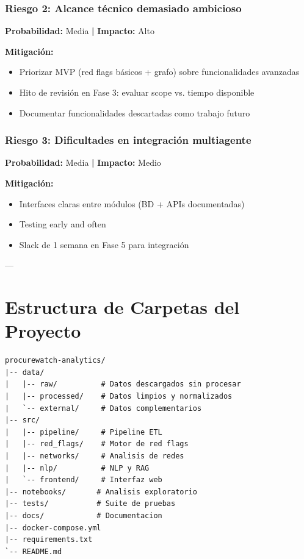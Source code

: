 \documentclass[11pt,a4paper,spanish]{book}
\numberwithin{equation}{chapter}
\numberwithin{figure}{chapter}
\begin{document}
\subsection{Riesgo 2: Alcance técnico demasiado ambicioso}

\textbf{Probabilidad:} Media \textbf{|} \textbf{Impacto:} Alto

\textbf{Mitigación:}
\begin{itemize}
\item Priorizar MVP (red flags básicos + grafo) sobre funcionalidades avanzadas
\item Hito de revisión en Fase 3: evaluar scope vs. tiempo disponible
\item Documentar funcionalidades descartadas como trabajo futuro
\end{itemize}

\subsection{Riesgo 3: Dificultades en integración multiagente}

\textbf{Probabilidad:} Media \textbf{|} \textbf{Impacto:} Medio

\textbf{Mitigación:}
\begin{itemize}
\item Interfaces claras entre módulos (BD + APIs documentadas)
\item Testing early and often
\item Slack de 1 semana en Fase 5 para integración
\end{itemize}

---

\appendix
\chapter{Estructura de Carpetas del Proyecto}

\begin{verbatim}
procurewatch-analytics/
|-- data/
|   |-- raw/          # Datos descargados sin procesar
|   |-- processed/    # Datos limpios y normalizados
|   `-- external/     # Datos complementarios
|-- src/
|   |-- pipeline/     # Pipeline ETL
|   |-- red_flags/    # Motor de red flags
|   |-- networks/     # Analisis de redes
|   |-- nlp/          # NLP y RAG
|   `-- frontend/     # Interfaz web
|-- notebooks/       # Analisis exploratorio
|-- tests/           # Suite de pruebas
|-- docs/            # Documentacion
|-- docker-compose.yml
|-- requirements.txt
`-- README.md
\end{verbatim}
\end{document}
